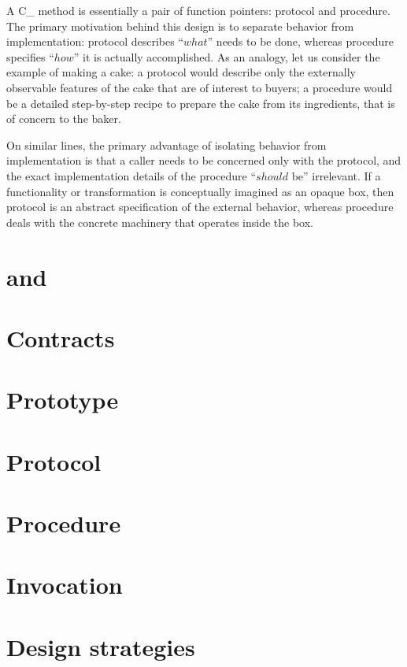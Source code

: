 \def\Section#1{\section{#1}}

A C\_ method is essentially a pair of function pointers: protocol and procedure.
The primary motivation behind this design is to separate behavior
from implementation: protocol describes ``$what$'' needs to be done,
whereas procedure specifies ``$how$'' it is actually accomplished.
As an analogy, let us consider the example of making a cake: a protocol would
describe only the externally observable features of the cake that are of
interest to buyers; a procedure would be a detailed step-by-step recipe to
prepare the cake from its ingredients, that is of concern to the baker.

On similar lines, the primary advantage of isolating behavior from
implementation is that a caller needs to be concerned only with the protocol,
and the exact implementation details of the procedure ``$should$ be'' irrelevant.
If a functionality or transformation is conceptually imagined as an opaque box,
then protocol is an abstract specification of the external behavior, whereas
procedure deals with the concrete machinery that operates inside the box.

\section { and }


\section {}


\Section{Contracts}

\Section{Prototype}

\Section{Protocol}

\Section{Procedure}

\Section{Invocation}

\Section{Design strategies}
